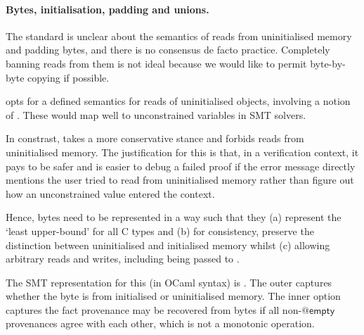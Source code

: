 \paragraph{Bytes, initialisation, padding and unions.}%
The  standard is unclear about the semantics of reads from
uninitialised memory and padding bytes, and there is no consensus de facto
practice. Completely banning reads from them is not ideal because we would like
to permit byte-by-byte copying if possible.

 opts for a defined semantics for reads of uninitialised objects,
involving a notion of . These would map well to
unconstrained variables in SMT solvers.

In constrast,  takes a more conservative stance and forbids reads from
uninitialised memory. The justification for this is that, in a verification
context, it pays to be safer and is easier to debug a failed proof if the error
message directly mentions the user tried to read from uninitialised memory
rather than figure out how an unconstrained value entered the context.


Hence, bytes need to be represented in a way such that they (a) represent the
`least upper-bound' for all C types and (b) for consistency, preserve the
distinction between uninitialised and initialised memory whilst (c) allowing
arbitrary reads and writes, including being passed to .

The SMT representation for this (in OCaml syntax) is
. The outer
 captures whether the byte is from initialised or
uninitialised memory. The inner option captures the fact provenance may be
recovered from bytes if all non-$@\mathsf{empty}$ provenances agree with each
other, which is not a monotonic operation.

